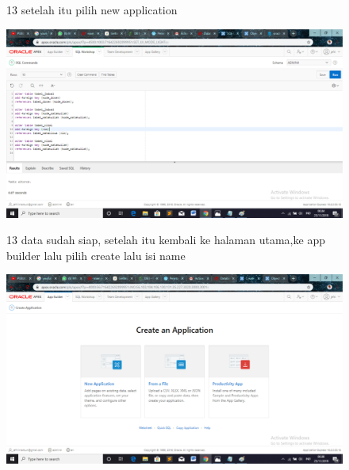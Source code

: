 \begin{enumerate}
\begin{figure}
\item[13]setelah itu pilih new application
 \begin{center}
\includegraphics[scale=0.4]{apex/ss17.png}
    \caption{\textit{}}
        \end{center}
\label{gambar}
\end{figure}

\begin{figure}
\item[13]data sudah siap, setelah itu kembali ke halaman utama,ke app builder lalu pilih create lalu isi name
 \begin{center}
\includegraphics[scale=0.4]{apex/ss19.png}
    \caption{\textit{}}
        \end{center}
\label{gambar}

\end{figure}


\end{enumerate}
